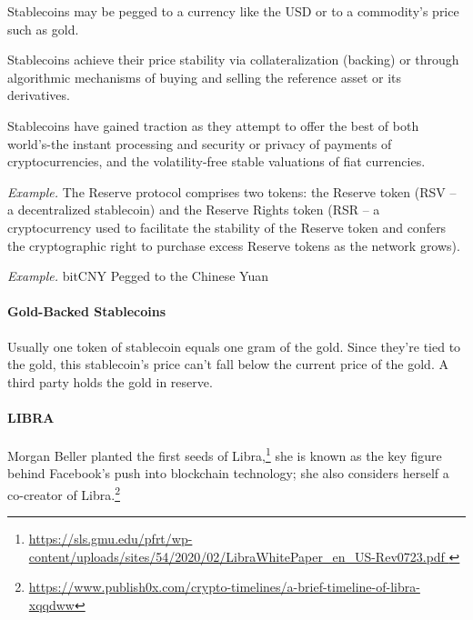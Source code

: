 Stablecoins may be pegged to a currency like the USD or to a commodity's price such as gold.

Stablecoins achieve their price stability via collateralization (backing) or through algorithmic mechanisms of buying and selling the reference asset or its derivatives.

Stablecoins have gained traction as they attempt to offer the best of both world's-the instant processing and security or privacy of payments of cryptocurrencies, and the volatility-free stable valuations of fiat currencies.

\emph{Example.} The Reserve protocol comprises two tokens: the Reserve token (RSV -- a decentralized stablecoin) and the Reserve Rights token (RSR -- a cryptocurrency used to facilitate the stability of the Reserve token and confers the cryptographic right to purchase excess Reserve tokens as the network grows).

\emph{Example.} bitCNY Pegged to the Chinese Yuan


\paragraph{Gold-Backed Stablecoins}
Usually one token of stablecoin equals one gram of the gold. Since they're tied to the gold, this stablecoin's price can't fall below the current price of the gold. A third party holds the gold in reserve.

\paragraph{LIBRA}

Morgan Beller planted the first seeds of Libra,\footnote{\url{https://sls.gmu.edu/pfrt/wp-content/uploads/sites/54/2020/02/LibraWhitePaper_en_US-Rev0723.pdf
}} she is known as the key figure behind Facebook's push into blockchain technology; she also considers herself a co-creator of Libra.\footnote{\url{https://www.publish0x.com/crypto-timelines/a-brief-timeline-of-libra-xqqdww}}

